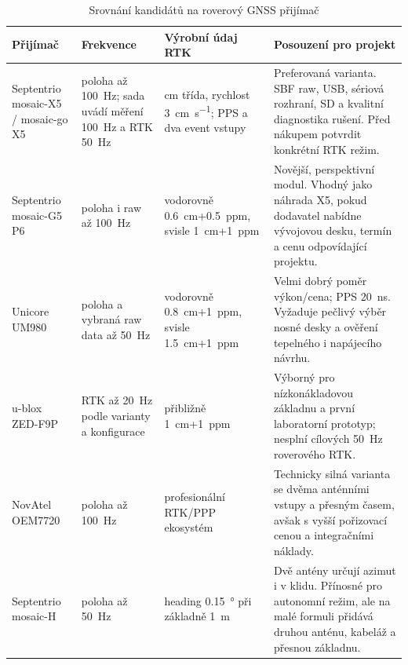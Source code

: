 \begin{table}[htbp]
  \centering
  \scriptsize
  \caption{Srovnání kandidátů na roverový GNSS přijímač}
  \label{tab:gnss}
  \begin{tabularx}{\textwidth}{@{}L{0.18\textwidth}L{0.15\textwidth}L{0.18\textwidth}Y@{}}
    \toprule
    Přijímač & Frekvence & Výrobní údaj RTK & Posouzení pro projekt \\
    \midrule
    Septentrio mosaic-X5 / mosaic-go X5
      & poloha až \SI{100}{Hz}; sada uvádí měření \SI{100}{Hz} a RTK \SI{50}{Hz}
      & cm třída, rychlost \SI{3}{cm\per\second}; PPS a dva event vstupy
      & Preferovaná varianta. SBF raw, USB, sériová rozhraní, SD a kvalitní
        diagnostika rušení. Před nákupem potvrdit konkrétní RTK režim.
        \cite{septentrio-mosaic,septentrio-mosaic-go,septentrio-hw-manual} \\
    Septentrio mosaic-G5 P6
      & poloha i raw až \SI{100}{Hz}
      & vodorovně \SI{0.6}{cm}+\SI{0.5}{ppm}, svisle \SI{1}{cm}+\SI{1}{ppm}
      & Novější, perspektivní modul. Vhodný jako náhrada X5, pokud dodavatel
        nabídne vývojovou desku, termín a cenu odpovídající projektu.
        \cite{septentrio-g5-p6} \\
    Unicore UM980
      & poloha a vybraná raw data až \SI{50}{Hz}
      & vodorovně \SI{0.8}{cm}+\SI{1}{ppm}, svisle \SI{1.5}{cm}+\SI{1}{ppm}
      & Velmi dobrý poměr výkon/cena; PPS \SI{20}{ns}. Vyžaduje pečlivý výběr
        nosné desky a ověření tepelného i napájecího návrhu.
        \cite{unicore-um980,unicore-protocol} \\
    u-blox ZED-F9P
      & RTK až \SI{20}{Hz} podle varianty a konfigurace
      & přibližně \SI{1}{cm}+\SI{1}{ppm}
      & Výborný pro nízkonákladovou základnu a první laboratorní prototyp;
        nesplní cílových \SI{50}{Hz} roverového RTK.
        \cite{ublox-f9p} \\
    NovAtel OEM7720
      & poloha až \SI{100}{Hz}
      & profesionální RTK/PPP ekosystém
      & Technicky silná varianta se dvěma anténními vstupy a přesným časem,
        avšak s vyšší pořizovací cenou a integračními náklady.
        \cite{novatel-oem7720} \\
    Septentrio mosaic-H
      & poloha až \SI{50}{Hz}
      & heading \SI{0.15}{\degree} při základně \SI{1}{m}
      & Dvě antény určují azimut i v klidu. Přínosné pro autonomní režim,
        ale na malé formuli přidává druhou anténu, kabeláž a přesnou základnu.
        \cite{septentrio-mosaic-h} \\
    \bottomrule
  \end{tabularx}
\end{table}

